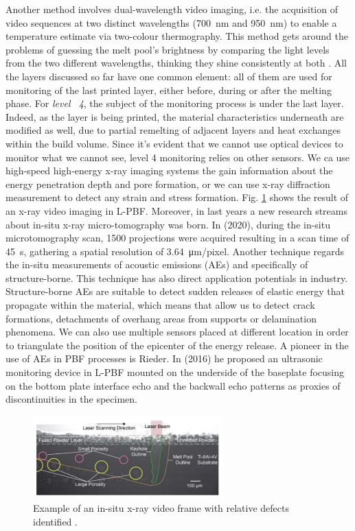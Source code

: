 Another method involves dual-wavelength video imaging, i.e. the acquisition of video sequences at two distinct wavelengths (\SI{700}{\nano\metre} and \SI{950}{\nano\metre}) to enable a temperature estimate via two-colour thermography. This method gets around the problems of guessing the melt pool's brightness by comparing the light levels from the two different wavelengths, thinking they shine consistently at both \cite{williams_situ_2019}.
All the layers discussed so far have one common element: all of them are used for monitoring of the last printed layer, either before, during or after the melting phase. For \emph{level ~4}, the subject of the monitoring process is under the last layer. Indeed, as the layer is being printed, the material characteristics underneath are modified as well, due to partial remelting of adjacent layers and heat exchanges within the build volume. Since it's evident that we cannot use optical devices to monitor what we cannot see, level 4 monitoring relies on other sensors. We ca use high-speed high-energy x-ray imaging systems the gain information about the energy penetration depth and pore formation, or we can use x-ray diffraction measurement to detect any strain and stress formation. Fig. \ref{fig:xray4} shows the result of an x-ray video imaging in L-PBF. Moreover, in last years a new research streams about in-situ x-ray micro-tomography was born. In \citeauthor{lhuissier_situ_2020} (2020), during the in-situ microtomography scan, 1500 projections were acquired resulting in a scan time of \SI{45}{s}, gathering a spatial resolution of \SI{3.64}{\micro\metre / pixel}. Another technique regards the in-situ measurements of acoustic emissions (AEs) and specifically of structure-borne. This technique has also direct application potentials in industry. Structure-borne AEs are suitable to detect sudden releases of elastic energy that propagate within the material, which means that allow us to detect crack formations, detachments of overhang areas from supports or delamination phenomena. We can also use multiple sensors placed at different location in order to triangulate the position of the epicenter of the energy release. A pioneer in the use of AEs in PBF processes is Rieder. In \citeauthor{rieder_-_2016} (2016) he proposed an ultrasonic monitoring device in L-PBF mounted on the underside of the baseplate focusing on the bottom plate interface echo and the backwall echo patterns as proxies of discontinuities in the specimen.
\begin{figure}
    \centering
    \includegraphics[width=0.65\textwidth]{Images/xray4.png}
    \caption[X-ray video frame.]{Example of an in-situ x-ray video frame with relative defects identified \cite{paulson_correlations_2020}.}
    \label{fig:xray4}
\end{figure}

